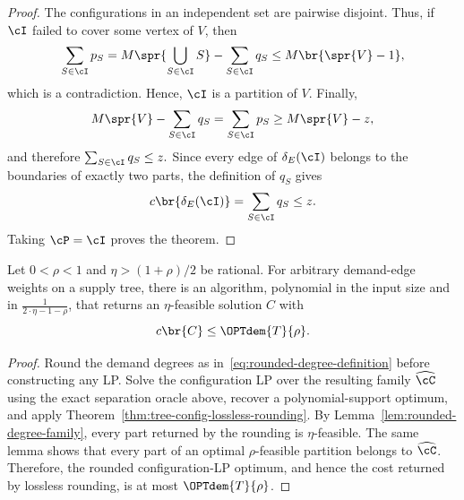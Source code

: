 \begin{proof}
    The configurations in an independent set are pairwise disjoint. Thus, if $\cI$ failed to cover some vertex of $V$, then
    \[
        \sum_{S\in\cI}p_S
        =M\spr{\bigcup_{S\in\cI}S}-\sum_{S\in\cI}q_S
        \leq M\br{\spr{V}-1},
    \]
    which is a contradiction. Hence, $\cI$ is a partition of $V$. Finally,
    \[
        M\spr{V}-\sum_{S\in\cI}q_S
        =\sum_{S\in\cI}p_S
        \geq M\spr{V}-z,
    \]
    and therefore $ \sum_{S\in\cI}q_S\leq z.$ Since every edge of $\delta_E(\cI)$ belongs to the boundaries of exactly two parts, the definition of $q_S$ gives
    \[
        c\br{\delta_E(\cI)}
        =\sum_{S\in\cI}q_S
        \leq z.
    \]
    Taking $\cP=\cI$ proves the theorem.
\end{proof}

\begin{theorem}\label{thm:tree-degree-config-direct}
    Let $0<\rho<1$ and $\eta>(1+\rho)/2$ be rational. For arbitrary demand-edge weights on a supply tree, there is an algorithm, polynomial in the input size and in $
        \frac{1}{2\cdot\eta-1-\rho}$,
    that returns an $\eta$-feasible solution $C$ with
    \[
        c\br{C}\leq\OPTdem{T}{\rho}.
    \]
\end{theorem}
\begin{proof}
    Round the demand degrees as in~\eqref{eq:rounded-degree-definition} before constructing any LP. Solve the configuration LP over the resulting family $\widehat\cC$ using the exact separation oracle above, recover a polynomial-support optimum, and apply Theorem~\ref{thm:tree-config-lossless-rounding}. By Lemma~\ref{lem:rounded-degree-family}, every part returned by the rounding is $\eta$-feasible. The same lemma shows that every part of an optimal $\rho$-feasible partition belongs to $\widehat\cC$. Therefore, the rounded configuration-LP optimum, and hence the cost returned by lossless rounding, is at most $\OPTdem{T}{\rho}$.
\end{proof}
\fi
